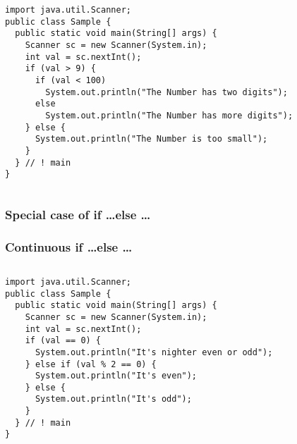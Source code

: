 \documentclass[en, 11pt, xcolor=dvipsnames]{beamer}
\begin{document}
\begin{frame}[fragile]

	\begin{columns}[c]
		\begin{column}{0.98\textwidth}

			\begin{lstlisting}[style=Java]
import java.util.Scanner;
public class Sample {
  public static void main(String[] args) {
    Scanner sc = new Scanner(System.in);
    int val = sc.nextInt();
    if (val > 9) {
      if (val < 100) 
        System.out.println("The Number has two digits");
      else
        System.out.println("The Number has more digits");
    } else {
      System.out.println("The Number is too small");
    }
  } // ! main
}\end{lstlisting}

		\end{column}
	\end{columns}
\end{frame}

\subsubsection{Special case of if \dots else \dots}
\begin{frame}[fragile]
	\frametitle{Continuous if \dots else \dots}



	\begin{columns}[c]
		\begin{column}{0.98\textwidth}

			\begin{lstlisting}[style=Java]
import java.util.Scanner;
public class Sample {
  public static void main(String[] args) {
    Scanner sc = new Scanner(System.in);
    int val = sc.nextInt();
    if (val == 0) {
      System.out.println("It's nighter even or odd");
    } else if (val % 2 == 0) {
      System.out.println("It's even");
    } else {
      System.out.println("It's odd");
    }
  } // ! main
}
\end{lstlisting}

		\end{column}
	\end{columns}

\end{frame}
\end{document}
